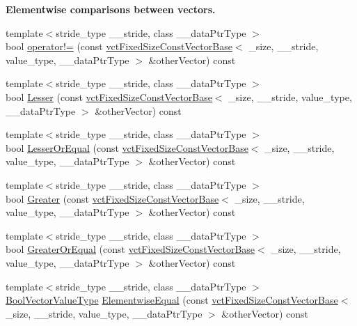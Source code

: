 \begin{Indent}{\bf Elementwise comparisons between vectors.}
\begin{DoxyCompactItemize}
\item 
{\footnotesize template$<$stride\-\_\-type \-\_\-\-\_\-stride, class \-\_\-\-\_\-data\-Ptr\-Type $>$ }\\bool \hyperlink{classvct_fixed_size_const_vector_base_a9cc58a2f86353b2c8d613ddf18442f0c}{operator!=} (const \hyperlink{classvct_fixed_size_const_vector_base}{vct\-Fixed\-Size\-Const\-Vector\-Base}$<$ \-\_\-size, \-\_\-\-\_\-stride, value\-\_\-type, \-\_\-\-\_\-data\-Ptr\-Type $>$ \&other\-Vector) const 
\item 
{\footnotesize template$<$stride\-\_\-type \-\_\-\-\_\-stride, class \-\_\-\-\_\-data\-Ptr\-Type $>$ }\\bool \hyperlink{classvct_fixed_size_const_vector_base_a6f1e9c515d2702d34579bf02ec9b20af}{Lesser} (const \hyperlink{classvct_fixed_size_const_vector_base}{vct\-Fixed\-Size\-Const\-Vector\-Base}$<$ \-\_\-size, \-\_\-\-\_\-stride, value\-\_\-type, \-\_\-\-\_\-data\-Ptr\-Type $>$ \&other\-Vector) const 
\item 
{\footnotesize template$<$stride\-\_\-type \-\_\-\-\_\-stride, class \-\_\-\-\_\-data\-Ptr\-Type $>$ }\\bool \hyperlink{classvct_fixed_size_const_vector_base_a4b261299156a998aaacaad3965cad247}{Lesser\-Or\-Equal} (const \hyperlink{classvct_fixed_size_const_vector_base}{vct\-Fixed\-Size\-Const\-Vector\-Base}$<$ \-\_\-size, \-\_\-\-\_\-stride, value\-\_\-type, \-\_\-\-\_\-data\-Ptr\-Type $>$ \&other\-Vector) const 
\item 
{\footnotesize template$<$stride\-\_\-type \-\_\-\-\_\-stride, class \-\_\-\-\_\-data\-Ptr\-Type $>$ }\\bool \hyperlink{classvct_fixed_size_const_vector_base_a96afecfdcad63e7c4726061da0b0be35}{Greater} (const \hyperlink{classvct_fixed_size_const_vector_base}{vct\-Fixed\-Size\-Const\-Vector\-Base}$<$ \-\_\-size, \-\_\-\-\_\-stride, value\-\_\-type, \-\_\-\-\_\-data\-Ptr\-Type $>$ \&other\-Vector) const 
\item 
{\footnotesize template$<$stride\-\_\-type \-\_\-\-\_\-stride, class \-\_\-\-\_\-data\-Ptr\-Type $>$ }\\bool \hyperlink{classvct_fixed_size_const_vector_base_a51d3b98adfbe986f056857c7fa5beada}{Greater\-Or\-Equal} (const \hyperlink{classvct_fixed_size_const_vector_base}{vct\-Fixed\-Size\-Const\-Vector\-Base}$<$ \-\_\-size, \-\_\-\-\_\-stride, value\-\_\-type, \-\_\-\-\_\-data\-Ptr\-Type $>$ \&other\-Vector) const 
\item 
{\footnotesize template$<$stride\-\_\-type \-\_\-\-\_\-stride, class \-\_\-\-\_\-data\-Ptr\-Type $>$ }\\\hyperlink{classvct_fixed_size_const_vector_base_a15899465a75a2f78965bdcf2d6e34bc5}{Bool\-Vector\-Value\-Type} \hyperlink{classvct_fixed_size_const_vector_base_a5b1ef9c19b953cba03dfa4679fa891de}{Elementwise\-Equal} (const \hyperlink{classvct_fixed_size_const_vector_base}{vct\-Fixed\-Size\-Const\-Vector\-Base}$<$ \-\_\-size, \-\_\-\-\_\-stride, value\-\_\-type, \-\_\-\-\_\-data\-Ptr\-Type $>$ \&other\-Vector) const 

\end{DoxyCompactItemize}
\end{Indent}

